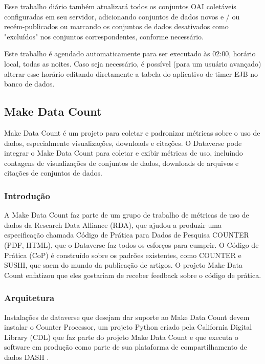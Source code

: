 \documentclass[12pt,hidelinks]{article}
\begin{document}
Esse trabalho diário também atualizará todos os conjuntos OAI coletáveis configuradas em seu servidor, adicionando conjuntos de dados novos e / ou recém-publicados ou marcando os conjuntos de dados desativados como "excluídos" nos conjuntos correspondentes, conforme necessário.

Este trabalho é agendado automaticamente para ser executado às 02:00, horário local, todas as noites. Caso seja necessário, é possível (para um usuário avançado) alterar esse horário editando diretamente a tabela do aplicativo de timer EJB no banco de dados.

\subsection{Make Data Count}

\qquad Make Data Count é um projeto para coletar e padronizar métricas sobre o uso de dados, especialmente visualizações, downloads e citações. O Dataverse pode integrar o Make Data Count para coletar e exibir métricas de uso, incluindo contagens de visualizações de conjuntos de dados, downloads de arquivos e citações de conjuntos de dados.

\subsubsection{Introdução}

\qquad A Make Data Count faz parte de um grupo de trabalho de métricas de uso de dados da Research Data Alliance (RDA), que ajudou a produzir uma especificação chamada Código de Prática para Dados de Pesquisa COUNTER (PDF, HTML), que o Dataverse faz todos os esforços para cumprir. O Código de Prática (CoP) é construído sobre os padrões existentes, como COUNTER e SUSHI, que saem do mundo da publicação de artigos. O projeto Make Data Count enfatizou que eles gostariam de receber feedback sobre o código de prática.

\subsubsection{Arquitetura}

\qquad Instalações de dataverse que desejam dar  suporte ao Make Data Count devem instalar o Counter Processor, um projeto Python criado pela California Digital Library (CDL) que faz parte do projeto Make Data Count e que executa o software em produção como parte de sua plataforma de compartilhamento de dados DASH .
\end{document}
